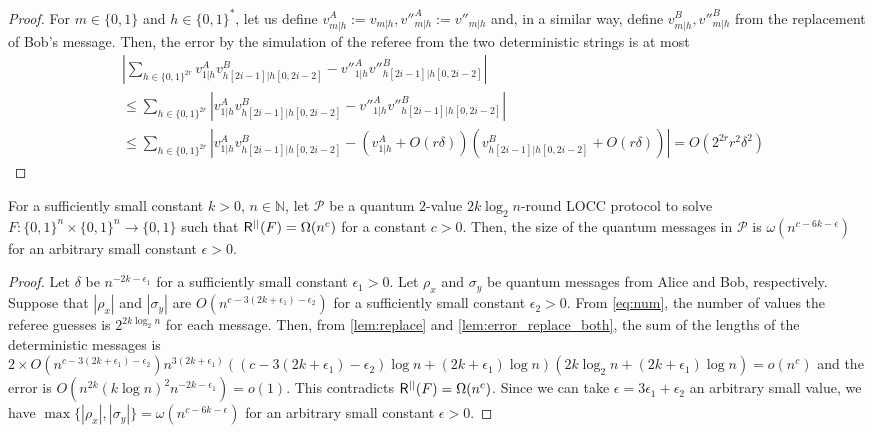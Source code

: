 \begin{proof}
For $m \in \{0,1\}$ and $h \in \{0,1\}^*$, let us define $v^A_{m|h} := v_{m|h}, v''^A_{m|h} := v''_{m|h}$ and, in a similar way, define $v^B_{m|h}, v''^B_{m|h}$ from the replacement of Bob's message.
Then, the error by the simulation of the referee from the two deterministic strings is at most
\begin{align*}
    & \left| \sum_{h \in \{0,1\}^{2r}} v^A_{1|h} v^B_{h[2i-1]|h[0,2i-2]} - v''^A_{1|h} v''^B_{h[2i-1]|h[0,2i-2]} \right| \\
    & \leq \sum_{h \in \{0,1\}^{2r}} \left| v^A_{1|h} v^B_{h[2i-1]|h[0,2i-2]} - v''^A_{1|h} v''^B_{h[2i-1]|h[0,2i-2]} \right| \\
    & \leq \sum_{h \in \{0,1\}^{2r}} \left| v^A_{1|h} v^B_{h[2i-1]|h[0,2i-2]} - \left( v^A_{1|h} + O(r\delta) \right) \left( v^B_{h[2i-1]|h[0,2i-2]} + O(r\delta) \right) \right| = O(2^{2r}r^2\delta^2) 
\end{align*}
\end{proof}

\begin{proposition}\label{prop:two-way-LOCC_general}
    For a sufficiently small constant $k>0$, $n \in\mathbb{N}$, let $\mathcal{P}$ be a quantum $2$-value $2k \log_2 n$-round LOCC protocol to solve $F:\{0,1\}^n \times \{0,1\}^n \rightarrow \{0,1\}$ such that $\mathsf{R}^{||}(F) = \Omega(n^c)$ for a constant $c>0$. Then, the size of the quantum messages in $\mathcal{P}$ is $\omega(n^{c-6k-\epsilon})$ for an arbitrary small constant $\epsilon >0$.
\end{proposition}

\begin{proof}
    Let $\delta$ be $n^{-2k-\epsilon_1}$ for a sufficiently small constant $\epsilon_1 >0$. Let $\rho_x$ and $\sigma_y$ be quantum messages from Alice and Bob, respectively. Suppose that $|\rho_x|$ and $|\sigma_y|$ are $O(n^{c-3(2k+\epsilon_1)-\epsilon_2})$ for a sufficiently small constant $\epsilon_2 >0$. From \cref{eq:num}, the number of values the referee guesses is $2^{2 k \log_2 n}$ for each message. Then, from \cref{lem:replace} and \cref{lem:error_replace_both}, the sum of the lengths of the deterministic messages is $2 \times O(n^{c-3(2k+\epsilon_1)-\epsilon_2}) n^{3(2k+\epsilon_1)} ((c-3(2k+\epsilon_1)-\epsilon_2)\log n + (2k+\epsilon_1) \log n) (2 k \log_2 n + (2k+\epsilon_1)\log n)= o(n^c)$ and the error is $O(n^{2k}(k \log n)^2 n^{-2k-\epsilon_1}) = o(1)$. This contradicts $\mathsf{R}^{||}(F) = \Omega(n^c)$. Since we can take $\epsilon = 3\epsilon_1+\epsilon_2$ an arbitrary small value, we have $\max\{|\rho_x|,|\sigma_y|\} = \omega(n^{c-6k-\epsilon})$ for an arbitrary small constant $\epsilon>0$.
\end{proof}

